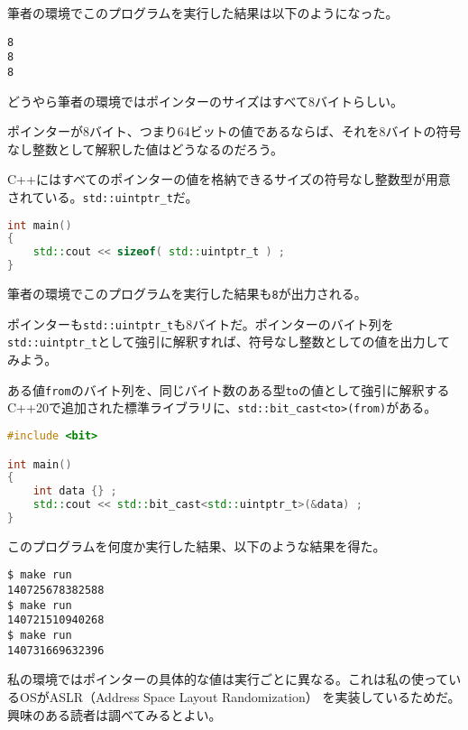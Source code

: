 筆者の環境でこのプログラムを実行した結果は以下のようになった。

\begin{lstlisting}[style=terminal]
8
8
8
\end{lstlisting}

どうやら筆者の環境ではポインターのサイズはすべて8バイトらしい。


ポインターが8バイト、つまり64ビットの値であるならば、それを8バイトの符号なし整数として解釈した値はどうなるのだろう。

C++にはすべてのポインターの値を格納できるサイズの符号なし整数型が用意されている。\texttt{std::uintptr\_t}だ。

\begin{lstlisting}[language={C++}]
int main()
{
    std::cout << sizeof( std::uintptr_t ) ;
}
\end{lstlisting}

筆者の環境でこのプログラムを実行した結果も\texttt{8}が出力される。

ポインターも\texttt{std::uintptr\_t}も8バイトだ。ポインターのバイト列を\texttt{std::uintptr\_t}として強引に解釈すれば、符号なし整数としての値を出力してみよう。

ある値\texttt{from}のバイト列を、同じバイト数のある型\texttt{to}の値として強引に解釈するC++20で追加された標準ライブラリに、\texttt{std::bit\_cast<to>(from)}がある。

\begin{lstlisting}[language={C++}]
#include <bit>

int main()
{
    int data {} ;
    std::cout << std::bit_cast<std::uintptr_t>(&data) ;
}
\end{lstlisting}

\ifTombow\pagebreak\fi
このプログラムを何度か実行した結果、以下のような結果を得た。

\begin{lstlisting}[style=terminal]
$ make run
140725678382588
$ make run
140721510940268
$ make run
140731669632396
\end{lstlisting}

私の環境ではポインターの具体的な値は実行ごとに異なる。これは私の使っているOSがASLR（Address Space Layout Randomization） を実装しているためだ。興味のある読者は調べてみるとよい。

